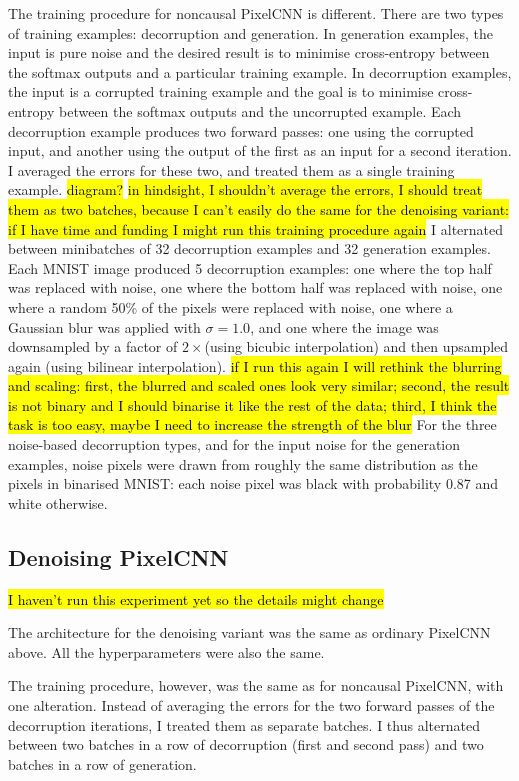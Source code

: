 \documentclass[10pt,a4paper]{article}
\begin{document}
The training procedure for noncausal PixelCNN is different. There are two types of training examples: decorruption and generation. In generation examples, the input is pure noise and the desired result is to minimise cross-entropy between the softmax outputs and a particular training example. In decorruption examples, the input is a corrupted training example and the goal is to minimise cross-entropy between the softmax outputs and the uncorrupted example. Each decorruption example produces two forward passes: one using the corrupted input, and another using the output of the first as an input for a second iteration. I averaged the errors for these two, and treated them as a single training example. \hl{diagram?} \hl{in hindsight, I shouldn't average the errors, I should treat them as two batches, because I can't easily do the same for the denoising variant: if I have time and funding I might run this training procedure again} I alternated between minibatches of 32 decorruption examples and 32 generation examples. Each MNIST image produced 5 decorruption examples: one where the top half was replaced with noise, one where the bottom half was replaced with noise, one where a random 50\% of the pixels were replaced with noise, one where a Gaussian blur was applied with $\sigma=1.0$, and one where the image was downsampled by a factor of $2\times$(using bicubic interpolation) and then upsampled again (using bilinear interpolation). \hl{if I run this again I will rethink the blurring and scaling: first, the blurred and scaled ones look very similar; second, the result is not binary and I should binarise it like the rest of the data; third, I think the task is too easy, maybe I need to increase the strength of the blur} For the three noise-based decorruption types, and for the input noise for the generation examples, noise pixels were drawn from roughly the same distribution as the pixels in binarised MNIST: each noise pixel was black with probability 0.87 and white otherwise.

\subsection{Denoising PixelCNN}

\hl{I haven't run this experiment yet so the details might change}

The architecture for the denoising variant was the same as ordinary PixelCNN above. All the hyperparameters were also the same.

The training procedure, however, was the same as for noncausal PixelCNN, with one alteration. Instead of averaging the errors for the two forward passes of the decorruption iterations, I treated them as separate batches. I thus alternated between two batches in a row of decorruption (first and second pass) and two batches in a row of generation.
\end{document}
